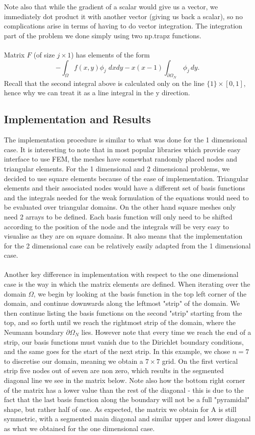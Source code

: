 \documentclass{article}
\begin{document}
Note also that while the gradient of a scalar would give us a vector, we immediately dot product it with another vector (giving us back a scalar), so no complications arise in terms of having to do vector integration. The integration part of the problem we done simply using two np.trapz functions.\\
\\
Matrix $F$ (of size $j\times 1$) has elements of the form
$$- \int_{\Omega} f(x,y)\phi_j \,\,dxdy - x(x-1)\int_{\partial\Omega_N} \,\phi_j \,dy.$$
Recall that the second integral above is calculated only on the line $\{1\}\times [0,1]$, hence why we can treat it as a line integral in the y direction. 
\subsection{Implementation and Results}
The implementation procedure is similar to what was done for the 1 dimensional case. It is interesting to note that in most popular libraries which provide easy interface to use FEM, the meshes have somewhat randomly placed nodes and triangular elements. For the 1 dimensional and 2 dimensional problems, we decided to use square elements because of the ease of implementation. Triangular elements and their associated nodes would have a different set of basis functions and the integrals needed for the weak formulation of the equations would need to be evaluated over triangular domains. On the other hand square meshes only need 2 arrays to be defined. Each basis function will only need to be shifted according to the position of the node and the integrals will be very easy to visualise as they are on square domains. It also means that the implementation for the 2 dimensional case can be relatively easily adapted from the 1 dimensional case. \\
\\
Another key difference in implementation with respect to the one dimensional case is the way in which the matrix elements are defined. When iterating over the domain $\Omega$, we begin by looking at the basis function in the top left corner of the domain, and continue downwards along the leftmost "strip" of the domain. We then continue listing the basis functions on the second "strip" starting from the top, and so forth until we reach the rightmost strip of the domain, where the Neumann boundary $\partial\Omega_N$ lies. However note that every time we reach the end of a strip, our basis functions must vanish due to the Dirichlet boundary conditions, and the same goes for the start of the next strip. In this example, we chose $n = 7$ to discretise our domain, meaning we obtain a $7\times7$ grid. On the first vertical strip five nodes out of seven are non zero, which results in the segmented diagonal line we see in the matrix below. Note also how the bottom right corner of the matrix has a lower value than the rest of the diagonal - this is due to the fact that the last basis function along the boundary will not be a full "pyramidal" shape, but rather half of one. As expected, the matrix we obtain for A is still symmetric, with a segmented main diagonal and similar upper and lower diagonal as what we obtained for the one dimensional case. 
\end{document}
